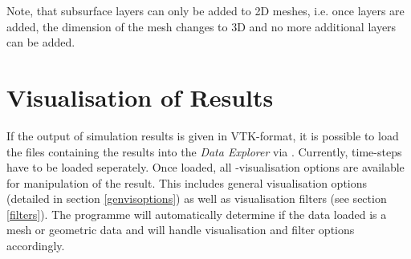 Note, that subsurface layers can only be added to 2D meshes, i.e. once layers are added, the dimension of the mesh changes to 3D and no more additional layers can be added.


%
%

\section{Visualisation of Results}

If the output of simulation results is given in VTK-format, it is possible to load the files containing the results into the \emph{Data Explorer} via . Currently, time-steps have to be loaded seperately. Once loaded, all \ogs-visualisation options are available for manipulation of the result. This includes general visualisation options (detailed in section \ref{genvisoptions}) as well as visualisation filters (see section \ref{filters}).
The programme will automatically determine if the data loaded is a mesh or geometric data and will handle visualisation and filter options accordingly.
